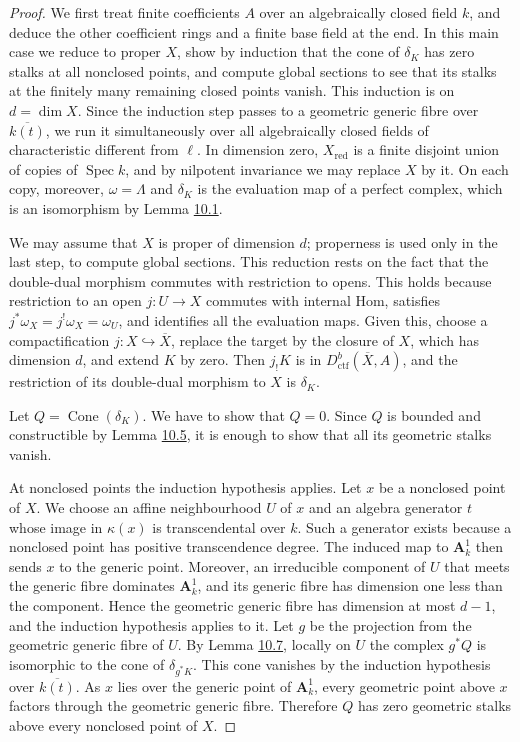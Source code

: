 \documentclass[11pt]{article}
\providecommand{\Cone}{}\renewcommand{\Cone}{\operatorname{Cone}}
\begin{document}
\begin{proof}[{Proof}]\label{bp126}%
We first treat finite coefficients \(A\) over an algebraically closed field \(k\), and deduce the other coefficient rings and a finite base field at the end. In this main case we reduce to proper \(X\), show by induction that the cone of \(\delta_K\) has zero stalks at all nonclosed points, and compute global sections to see that its stalks at the finitely many remaining closed points vanish. This induction is on \(d=\dim X\). Since the induction step passes to a geometric generic fibre over \(\overline{k(t)}\), we run it simultaneously over all algebraically closed fields of characteristic different from \(\ell\). In dimension zero, \(X_{\mathrm{red}}\) is a finite disjoint union of copies of \(\operatorname{Spec}k\), and by nilpotent invariance we may replace \(X\) by it. On each copy, moreover, \(\omega=\Lambda\) and \(\delta_K\) is the evaluation map of a perfect complex, which is an isomorphism by Lemma \hyperref[bp105]{10.1}.

We may assume that \(X\) is proper of dimension \(d\); properness is used only in the last step, to compute global sections. This reduction rests on the fact that the double-dual morphism commutes with restriction to opens. This holds because restriction to an open \(j:U\to X\) commutes with internal Hom, satisfies \(j^*\omega_X=j^!\omega_X=\omega_U\), and identifies all the evaluation maps. Given this, choose a compactification \(j:X\hookrightarrow\overline X\), replace the target by the closure of \(X\), which has dimension \(d\), and extend \(K\) by zero. Then \(j_!K\) is in \(D^b_{\mathrm{ctf}}(\overline X,A)\), and the restriction of its double-dual morphism to \(X\) is \(\delta_K\).

Let \(Q=\Cone(\delta_K)\). We have to show that \(Q=0\). Since \(Q\) is bounded and constructible by Lemma \hyperref[bp116]{10.5}, it is enough to show that all its geometric stalks vanish.

At nonclosed points the induction hypothesis applies. Let \(x\) be a nonclosed point of \(X\). We choose an affine neighbourhood \(U\) of \(x\) and an algebra generator \(t\) whose image in \(\kappa(x)\) is transcendental over \(k\). Such a generator exists because a nonclosed point has positive transcendence degree. The induced map to \(\mathbf A^1_k\) then sends \(x\) to the generic point. Moreover, an irreducible component of \(U\) that meets the generic fibre dominates \(\mathbf A^1_k\), and its generic fibre has dimension one less than the component. Hence the geometric generic fibre has dimension at most \(d-1\), and the induction hypothesis applies to it. Let \(g\) be the projection from the geometric generic fibre of \(U\). By Lemma \hyperref[bp122]{10.7}, locally on \(U\) the complex \(g^*Q\) is isomorphic to the cone of \(\delta_{g^*K}\). This cone vanishes by the induction hypothesis over \(\overline{k(t)}\). As \(x\) lies over the generic point of \(\mathbf A^1_k\), every geometric point above \(x\) factors through the geometric generic fibre. Therefore \(Q\) has zero geometric stalks above every nonclosed point of \(X\).


\end{proof}
\end{document}
